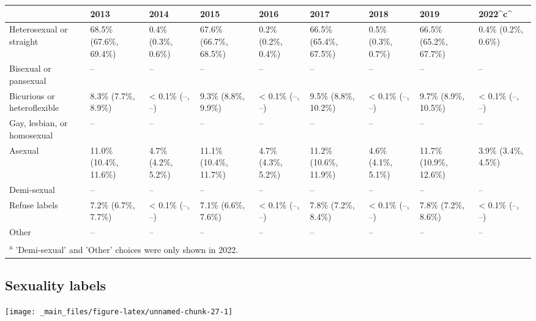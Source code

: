 \documentclass[
]{book}
\begin{document}
\begin{table}
\centering
\begin{tabular}[t]{>{}l|>{}l|>{}l|>{}l|>{}l|>{}l|>{}l|>{}l|>{}l}
\hline
  & 2013 & 2014 & 2015 & 2016 & 2017 & 2018 & 2019 & 2022\textasciicircum{}c\textasciicircum{}\\
\hline
Heterosexual or 
 straight & 68.5\% (67.6\%, 69.4\%) & 0.4\% (0.3\%, 0.6\%) & 67.6\% (66.7\%, 68.5\%) & 0.2\% (0.2\%, 0.4\%) & 66.5\% (65.4\%, 67.5\%) & 0.5\% (0.3\%, 0.7\%) & 66.5\% (65.2\%, 67.7\%) & 0.4\% (0.2\%, 0.6\%)\\
\hline
Bisexual or 
 pansexual & -- & -- & -- & -- & -- & -- & -- & --\\
\hline
Bicurious or 
 heteroflexible & 8.3\% (7.7\%, 8.9\%) & < 0.1\% (--, --) & 9.3\% (8.8\%, 9.9\%) & < 0.1\% (--, --) & 9.5\% (8.8\%, 10.2\%) & < 0.1\% (--, --) & 9.7\% (8.9\%, 10.5\%) & < 0.1\% (--, --)\\
\hline
Gay, lesbian, or 
 homosexual & -- & -- & -- & -- & -- & -- & -- & --\\
\hline
Asexual & 11.0\% (10.4\%, 11.6\%) & 4.7\% (4.2\%, 5.2\%) & 11.1\% (10.4\%, 11.7\%) & 4.7\% (4.3\%, 5.2\%) & 11.2\% (10.6\%, 11.9\%) & 4.6\% (4.1\%, 5.1\%) & 11.7\% (10.9\%, 12.6\%) & 3.9\% (3.4\%, 4.5\%)\\
\hline
Demi-sexual & -- & -- & -- & -- & -- & -- & -- & --\\
\hline
Refuse labels & 7.2\% (6.7\%, 7.7\%) & < 0.1\% (--, --) & 7.1\% (6.6\%, 7.6\%) & < 0.1\% (--, --) & 7.8\% (7.2\%, 8.4\%) & < 0.1\% (--, --) & 7.8\% (7.2\%, 8.6\%) & < 0.1\% (--, --)\\
\hline
Other & -- & -- & -- & -- & -- & -- & -- & --\\
\hline
\multicolumn{9}{l}{\rule{0pt}{1em}\textsuperscript{a} 'Demi-sexual' and 'Other' choices were only shown in 2022.}\\
\end{tabular}
\end{table}

\hypertarget{sexuality-labels}{%
\subsection{Sexuality labels}\label{sexuality-labels}}

\texttt{[image: \_main\_files/figure-latex/unnamed-chunk-27-1]}
\end{document}
